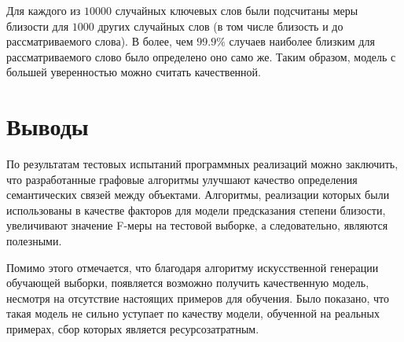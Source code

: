Для каждого из $10000$ случайных ключевых слов были подсчитаны меры близости для $1000$ других случайных слов (в том числе близость и до рассматриваемого слова). В более, чем $99.9\%$ случаев наиболее близким для рассматриваемого слово было определено оно само же. Таким образом, модель с большей уверенностью можно считать качественной.


\section{Выводы}

По результатам тестовых испытаний программных реализаций можно заключить, что разработанные графовые алгоритмы улучшают качество определения семантических связей между объектами. Алгоритмы, реализации которых были использованы в качестве факторов для модели предсказания степени близости, увеличивают значение F-меры на тестовой выборке, а следовательно, являются полезными. 

Помимо этого отмечается, что благодаря алгоритму искусственной генерации обучающей выборки, появляется возможно получить качественную модель, несмотря на отсутствие настоящих примеров для обучения. Было показано, что такая модель не сильно уступает по качеству модели, обученной на реальных примерах, сбор которых является ресурсозатратным.

